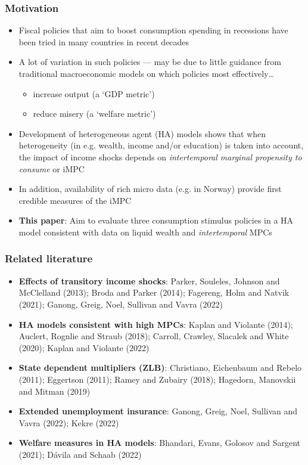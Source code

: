 \documentclass[pdflatex,aspectratio=169, handout]{beamer}
\begin{document}
\begin{frame}
	\frametitle{Motivation}
	\begin{itemize}
		\itemsep = .5\bigskipamount 
		\item Fiscal policies that aim to boost consumption spending in recessions have been tried in many countries in recent decades 
		\item A lot of variation in such policies --- may be due to little guidance from traditional macroeconomic models on which policies most effectively\ldots 
		\begin{itemize}
			\itemsep = .25\bigskipamount 
			\item increase output (a `GDP metric')
			\item reduce misery (a `welfare metric')
		\end{itemize}
		\item Development of heterogeneous agent (HA) models shows that when heterogeneity (in e.g. wealth, income and/or education) is taken into account, the impact of income shocks depends on \textit{intertemporal marginal propensity to consume} or iMPC 
		\item In addition, availability of rich micro data (e.g. in Norway) provide first credible measures of the iMPC 
		\item \textbf{This paper}: Aim to evaluate three consumption stimulus policies in a HA model consistent with data on liquid wealth and \textit{intertemporal} MPCs 
	\end{itemize}
\end{frame}


\begin{frame}
  \frametitle{Related literature}
  \small
  \begin{itemize}[<+->]
  \item \textbf{Effects of transitory income shocks}: 
    Parker, Souleles, Johnson and McClelland (2013); Broda and Parker (2014); Fagereng, Holm and Natvik (2021); Ganong, Greig, Noel, Sullivan and Vavra (2022)
  \item \textbf{HA models consistent with high MPCs}: 
    Kaplan and Violante (2014); Auclert, Rognlie and Straub (2018); Carroll, Crawley, Slacalek and White (2020); Kaplan and Violante (2022) 
  \item \textbf{State dependent multipliers (ZLB)}: 
    Christiano, Eichenbaum and Rebelo (2011); Eggertson (2011); Ramey and Zubairy (2018); Hagedorn, Manovskii and Mitman (2019) 
  \item \textbf{Extended unemployment insurance}:
    Ganong, Greig, Noel, Sullivan and Vavra (2022); Kekre (2022) 
  \item \textbf{Welfare measures in HA models}:
    Bhandari, Evans, Golosov and Sargent (2021); D{\'a}vila and Schaab (2022)
  \end{itemize}
  \normalsize
\end{frame}
\end{document}
